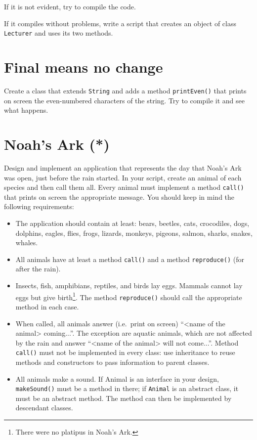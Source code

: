 \documentclass{article}
\begin{document}
If it is not evident, try to compile the code. 

If it compiles without problems, write a script that creates an object
of class \verb+Lecturer+ and uses its two methods. 


\section{Final means no change}
\label{sec:final-means-no}

Create a class that extends \verb+String+ and adds a method
\verb+printEven()+ that prints on screen the even-numbered characters
of the string. Try to compile it and see what happens. 

\section{Noah's Ark (*)}
\label{sec:noahs-ark}

Design and implement an application that represents the day that
Noah's Ark was open, just before the rain started. In your script,
create an animal of each species and then call them all. Every animal
must implement a method \verb+call()+ that prints on screen the
appropriate message. You should keep in mind the following
requirements: 

\begin{itemize}
\item The application should contain at least: bears, beetles, cats,
  crocodiles, dogs, dolphins, eagles, flies, frogs, lizards, monkeys,
  pigeons, salmon, sharks, snakes, whales.
\item All animals have at least a method \verb+call()+ and a method
  \verb+reproduce()+ (for after the rain). 
\item Insects, fish, amphibians, reptiles, and birds lay eggs. Mammals
  cannot lay eggs but give birth\footnote{There were no platipus in
    Noah's Ark.}. The method \verb+reproduce()+ should call the
  appropriate method in each case. 
\item When called, all animals answer (i.e.~print on screen) ``<name of
  the animal> coming...''. The exception are aquatic animals,
  which are not affected by the rain and answer ``<name of the animal>
  will not come...''. Method \verb+call()+ must not be implemented in
  every class: use inheritance to reuse methods and constructors to
  pass information to parent classes.
\item All animals make a sound. If Animal is an interface in your
  design, \verb+makeSound()+ must be a method in there; if
  \verb+Animal+ is an abstract class, it must be an abstract
  method. The method can then be implemented by descendant classes.
\end{itemize}
\end{document}
